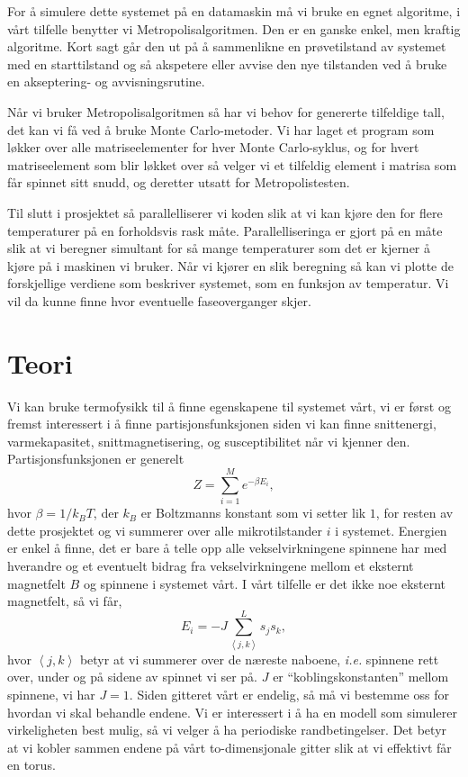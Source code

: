 \documentclass[norsk, 10pt]{article}
\def\mean#1{\left\langle #1 \right\rangle}
\begin{document}
For å simulere dette systemet på en datamaskin må vi bruke en egnet algoritme, i vårt tilfelle benytter vi Metropolisalgoritmen. Den er en ganske enkel, men kraftig algoritme. Kort sagt går den ut på å sammenlikne en prøvetilstand av systemet med en starttilstand og så akspetere eller avvise den nye tilstanden ved å bruke en akseptering- og avvisningsrutine.

Når vi bruker Metropolisalgoritmen så har vi behov for genererte tilfeldige tall, det kan vi få ved å bruke Monte Carlo-metoder. Vi har laget et program som løkker over alle matriseelementer for hver Monte Carlo-syklus, og for hvert matriseelement som blir løkket over så velger vi et tilfeldig element i matrisa som får spinnet sitt snudd, og deretter utsatt for Metropolistesten.

Til slutt i prosjektet så parallelliserer vi koden slik at vi kan kjøre den for flere temperaturer på en forholdsvis rask måte. Parallelliseringa er gjort på en måte slik at vi beregner simultant for så mange temperaturer som det er kjerner å kjøre på i maskinen vi bruker. Når vi kjører en slik beregning så kan vi plotte de forskjellige verdiene som beskriver systemet, som en funksjon av temperatur. Vi vil da kunne finne hvor eventuelle faseoverganger skjer.

\section*{Teori}
Vi kan bruke termofysikk til å finne egenskapene til systemet vårt, vi er først og fremst interessert i å finne partisjonsfunksjonen siden vi kan finne snittenergi, varmekapasitet, snittmagnetisering, og susceptibilitet når vi kjenner den. Partisjonsfunksjonen er generelt
$$ Z = \sum\limits_{i=1}^{M} e^{-\beta E_i}, $$
hvor $\beta = 1/k_B T$, der $k_B$ er Boltzmanns konstant som vi setter lik $1$, for resten av dette prosjektet og vi summerer over alle mikrotilstander $i$ i systemet. Energien er enkel å finne, det er bare å telle opp alle vekselvirkningene spinnene har med hverandre og et eventuelt bidrag fra vekselvirkningene mellom et eksternt magnetfelt $B$ og spinnene i systemet vårt. I vårt tilfelle er det ikke noe eksternt magnetfelt, så vi får,
$$ E_i = -J\sum\limits_{\mean{j,k}}^{L} s_js_k, $$
hvor $\mean{j,k}$ betyr at vi summerer over de næreste naboene, \emph{i.e.} spinnene rett over, under og på sidene av spinnet vi ser på. $J$ er ``koblingskonstanten'' mellom spinnene, vi har $J=1$. Siden gitteret vårt er endelig, så må vi bestemme oss for hvordan vi skal behandle endene. Vi er interessert i å ha en modell som simulerer virkeligheten best mulig, så vi velger å ha periodiske randbetingelser. Det betyr at vi kobler sammen endene på vårt to-dimensjonale gitter slik at vi effektivt får en torus.
\end{document}
